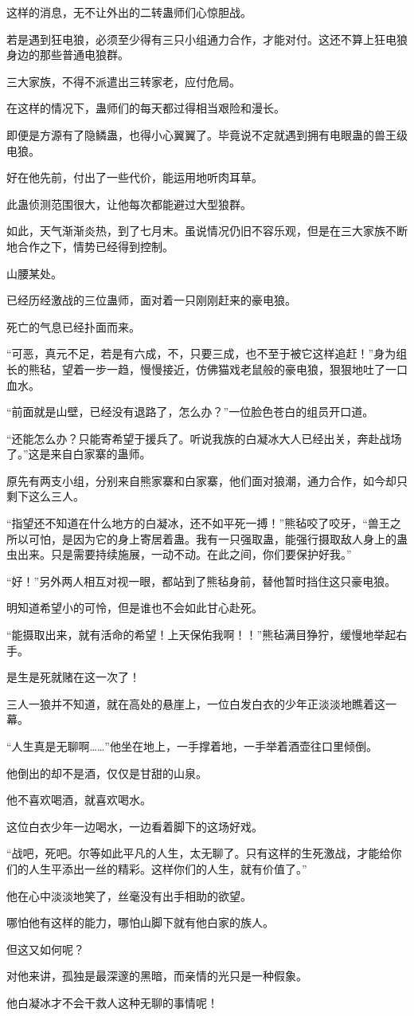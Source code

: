 \begin{this_body}
这样的消息，无不让外出的二转蛊师们心惊胆战。

若是遇到狂电狼，必须至少得有三只小组通力合作，才能对付。这还不算上狂电狼身边的那些普通电狼群。

三大家族，不得不派遣出三转家老，应付危局。

在这样的情况下，蛊师们的每天都过得相当艰险和漫长。

即便是方源有了隐鳞蛊，也得小心翼翼了。毕竟说不定就遇到拥有电眼蛊的兽王级电狼。

好在他先前，付出了一些代价，能运用地听肉耳草。

此蛊侦测范围很大，让他每次都能避过大型狼群。

如此，天气渐渐炎热，到了七月末。虽说情况仍旧不容乐观，但是在三大家族不断地合作之下，情势已经得到控制。

山腰某处。

已经历经激战的三位蛊师，面对着一只刚刚赶来的豪电狼。

死亡的气息已经扑面而来。

“可恶，真元不足，若是有六成，不，只要三成，也不至于被它这样追赶！”身为组长的熊毡，望着一步一趋，慢慢接近，仿佛猫戏老鼠般的豪电狼，狠狠地吐了一口血水。

“前面就是山壁，已经没有退路了，怎么办？”一位脸色苍白的组员开口道。

“还能怎么办？只能寄希望于援兵了。听说我族的白凝冰大人已经出关，奔赴战场了。”这是来自白家寨的蛊师。

原先有两支小组，分别来自熊家寨和白家寨，他们面对狼潮，通力合作，如今却只剩下这么三人。

“指望还不知道在什么地方的白凝冰，还不如平死一搏！”熊毡咬了咬牙，“兽王之所以可怕，是因为它的身上寄居着蛊。我有一只强取蛊，能强行摄取敌人身上的蛊虫出来。只是需要持续施展，一动不动。在此之间，你们要保护好我。”

“好！”另外两人相互对视一眼，都站到了熊毡身前，替他暂时挡住这只豪电狼。

明知道希望小的可怜，但是谁也不会如此甘心赴死。

“能摄取出来，就有活命的希望！上天保佑我啊！！”熊毡满目狰狞，缓慢地举起右手。

是生是死就赌在这一次了！

三人一狼并不知道，就在高处的悬崖上，一位白发白衣的少年正淡淡地瞧着这一幕。

“人生真是无聊啊……”他坐在地上，一手撑着地，一手举着酒壶往口里倾倒。

他倒出的却不是酒，仅仅是甘甜的山泉。

他不喜欢喝酒，就喜欢喝水。

这位白衣少年一边喝水，一边看着脚下的这场好戏。

“战吧，死吧。尔等如此平凡的人生，太无聊了。只有这样的生死激战，才能给你们的人生平添出一丝的精彩。这样你们的人生，就有价值了。”

他在心中淡淡地笑了，丝毫没有出手相助的欲望。

哪怕他有这样的能力，哪怕山脚下就有他白家的族人。

但这又如何呢？

对他来讲，孤独是最深邃的黑暗，而亲情的光只是一种假象。

他白凝冰才不会干救人这种无聊的事情呢！

\end{this_body}

